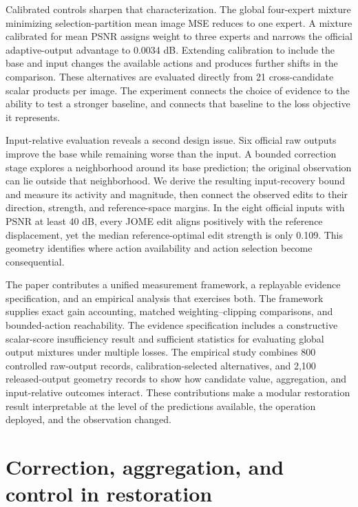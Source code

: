 \documentclass[12pt]{article}
\begin{document}
Calibrated controls sharpen that characterization. The global four-expert mixture minimizing selection-partition mean image MSE reduces to one expert. A mixture calibrated for mean PSNR assigns weight to three experts and narrows the official adaptive-output advantage to 0.0034 dB. Extending calibration to include the base and input changes the available actions and produces further shifts in the comparison. These alternatives are evaluated directly from 21 cross-candidate scalar products per image. The experiment connects the choice of evidence to the ability to test a stronger baseline, and connects that baseline to the loss objective it represents.

Input-relative evaluation reveals a second design issue. Six official raw outputs improve the base while remaining worse than the input. A bounded correction stage explores a neighborhood around its base prediction; the original observation can lie outside that neighborhood. We derive the resulting input-recovery bound and measure its activity and magnitude, then connect the observed edits to their direction, strength, and reference-space margins. In the eight official inputs with PSNR at least 40 dB, every JOME edit aligns positively with the reference displacement, yet the median reference-optimal edit strength is only 0.109. This geometry identifies where action availability and action selection become consequential.

The paper contributes a unified measurement framework, a replayable evidence specification, and an empirical analysis that exercises both. The framework supplies exact gain accounting, matched weighting--clipping comparisons, and bounded-action reachability. The evidence specification includes a constructive scalar-score insufficiency result and sufficient statistics for evaluating global output mixtures under multiple losses. The empirical study combines 800 controlled raw-output records, calibration-selected alternatives, and 2,100 released-output geometry records to show how candidate value, aggregation, and input-relative outcomes interact. These contributions make a modular restoration result interpretable at the level of the predictions available, the operation deployed, and the observation changed.

\section{Correction, aggregation, and control in restoration}
\label{sec:related}
\end{document}
